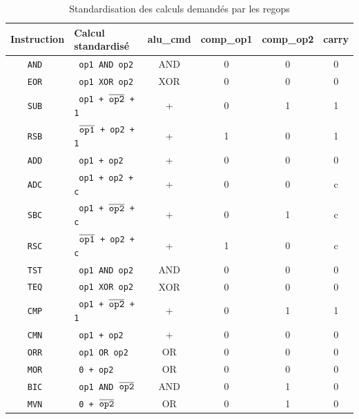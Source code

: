 \documentclass{article}
\begin{document}
\begin{table}[H]
\centering
\begingroup
\setlength{\tabcolsep}{5pt}
\renewcommand{\arraystretch}{1.1}
\begin{tabular}{ | c | l | c | c | c | c | }
\hline
Instruction & Calcul standardisé  & alu\_cmd & comp\_op1 & comp\_op2 & carry \\
\hline
\tt{AND}    &  \tt{ op1 AND op2 } &                             AND & 0 & 0 & 0 \\
\hline
\tt{EOR}    &  \tt{ op1 XOR op2 } &                             XOR & 0 & 0 & 0 \\
\hline
\tt{SUB}    &  \tt{ op1 + $\overline{\tt{op2}}$ + 1 } &           + & 0 & 1 & 1 \\
\hline
\tt{RSB}    &  \tt{ $\overline{\tt{op1}}$ + op2 + 1} &            + & 1 & 0 & 1 \\
\hline
\tt{ADD}    &  \tt{ op1 + op2 } &                                 + & 0 & 0 & 0 \\
\hline
\tt{ADC}    &  \tt{ op1 + op2 + c} &                              + & 0 & 0 & c \\
\hline
\tt{SBC}    &  \tt{ op1 + $\overline{\tt{op2}}$ + c} &            + & 0 & 1 & c \\
\hline
\tt{RSC}    &  \tt{ $\overline{\tt{op1}}$ + op2 + c} &            + & 1 & 0 & c \\
\hline
\tt{TST}    &  \tt{ op1 AND op2 } &                             AND & 0 & 0 & 0 \\
\hline
\tt{TEQ}    &  \tt{ op1 XOR op2 } &                             XOR & 0 & 0 & 0 \\
\hline
\tt{CMP}    &  \tt{ op1 + $\overline{\tt{op2}}$ + 1 } &           + & 0 & 1 & 1 \\
\hline
\tt{CMN}    &  \tt{ op1 + op2 } &                                 + & 0 & 0 & 0 \\
\hline
\tt{ORR}    &  \tt{ op1 OR op2 } &                               OR & 0 & 0 & 0 \\
\hline
\tt{MOR}    &  \tt{ 0 + op2 } &                                  OR & 0 & 0 & 0 \\
\hline
\tt{BIC}    &  \tt{ op1 AND $\overline{\tt{op2}}$ } &           AND & 0 & 1 & 0 \\
\hline
\tt{MVN}    &  \tt{ 0 + $\overline{\tt{op2}}$ } &                OR & 0 & 1 & 0 \\
\hline
\end{tabular}
\endgroup
\caption{Standardisation des calculs demandés par les regops}
\label{regops-exe}
\end{table}
\end{document}
